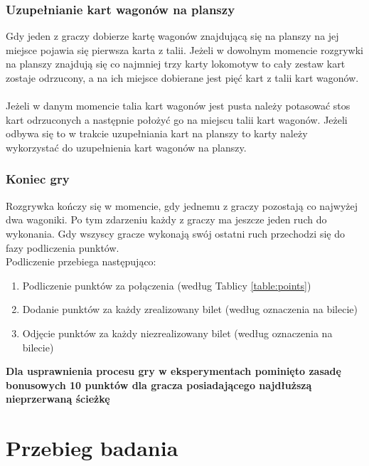 \documentclass[12pt, oneside]{report}
\begin{document}
\subsection{Uzupełnianie kart wagonów na planszy}
Gdy jeden z graczy dobierze kartę wagonów znajdującą się na planszy na jej miejsce pojawia się pierwsza karta z talii. Jeżeli w dowolnym momencie rozgrywki na planszy znajdują się co najmniej trzy karty lokomotyw to cały zestaw kart zostaje odrzucony, a na ich miejsce dobierane jest pięć kart z talii kart wagonów. \\ \\
Jeżeli w danym momencie talia kart wagonów jest pusta należy potasować stos kart odrzuconych a następnie położyć go na miejscu talii kart wagonów. Jeżeli odbywa się to w trakcie uzupełniania kart na planszy to karty należy wykorzystać do uzupełnienia kart wagonów na planszy. 
\subsection{Koniec gry}
Rozgrywka kończy się w momencie, gdy jednemu z graczy pozostają co najwyżej dwa wagoniki. Po tym zdarzeniu każdy z graczy ma jeszcze jeden ruch do wykonania. Gdy wszyscy gracze wykonają swój ostatni ruch przechodzi się do fazy podliczenia punktów. \\
Podliczenie przebiega następująco:
\begin{enumerate}
	\item Podliczenie punktów za połączenia (według Tablicy \ref{table:points})
	\item Dodanie punktów za każdy zrealizowany bilet (według oznaczenia na bilecie)
	\item Odjęcie punktów za każdy niezrealizowany bilet (według oznaczenia na bilecie)
\end{enumerate}
\textbf{Dla usprawnienia procesu gry w eksperymentach pominięto zasadę bonusowych 10 punktów dla gracza posiadającego najdłuższą nieprzerwaną ścieżkę}
\chapter{Przebieg badania}
\end{document}
